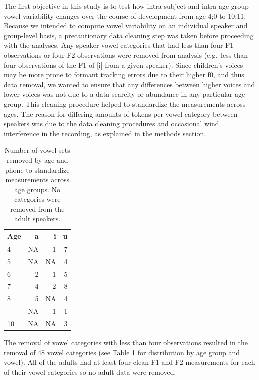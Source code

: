 \documentclass[
]{article}
\begin{document}
The first objective in this study is to test how intra-subject and intra-age group vowel variability changes over the course of development from age 4;0 to 10;11. Because we intended to compute vowel variability on an individual speaker and group-level basis, a precautionary data cleaning step was taken before proceeding with the analyses. Any speaker vowel categories that had less than four F1 observations or four F2 observations were removed from analysis (e.g.~less than four observations of the F1 of {[}i{]} from a given speaker). Since children's voices may be more prone to formant tracking errors due to their higher f0, and thus data removal, we wanted to ensure that any differences between higher voices and lower voices was not due to a data scarcity or abundance in any particular age group. This cleaning procedure helped to standardize the measurements across ages. The reason for differing amounts of tokens per vowel category between speakers was due to the data cleaning procedures and occasional wind interference in the recording, as explained in the methods section.

\begin{table}[!h]

\caption{\label{tab:vowel-removed-tbl}Number of vowel sets removed by age and phone to standardize measurements across age groups. No categories were removed from the adult speakers.}
\centering
\begin{tabular}[t]{lrrr}
\toprule
Age & a & i & u\\
\midrule
4 & NA & 1 & 7\\
5 & NA & NA & 4\\
6 & 2 & 1 & 5\\
7 & 4 & 2 & 8\\
8 & 5 & NA & 4\\
\addlinespace
9 & NA & 1 & 1\\
10 & NA & NA & 3\\
\bottomrule
\end{tabular}
\end{table}

The removal of vowel categories with less than four observations resulted in the removal of 48 vowel categories (see Table \ref{tab:vowel-removed-tbl} for distribution by age group and vowel). All of the adults had at least four clean F1 and F2 measurements for each of their vowel categories so no adult data were removed.
\end{document}

